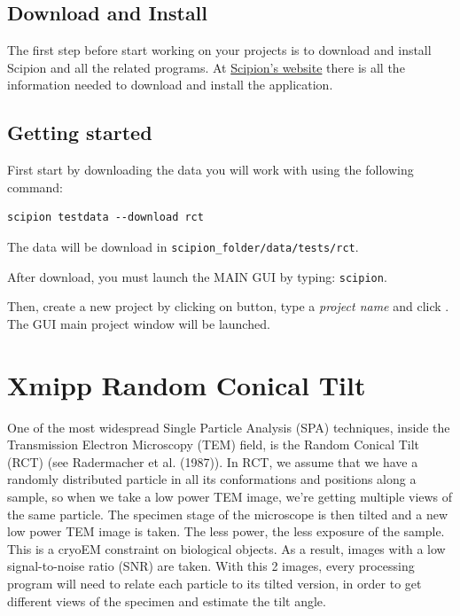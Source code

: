 \documentclass[12pt]{article} %
\begin{document}
\subsection{Download and Install}

The first step before start working on your projects is to download and
install Scipion and all the related programs. At \href{http://scipionwiki.cnb.csic.es}{Scipion's website} 
there is all the information needed to download and install the application.

\subsection{Getting started}

First start by downloading the data you will work with using the following command:

\begin{verbatim}
scipion testdata --download rct
\end{verbatim}

The data will be download in \verb+scipion_folder/data/tests/rct+.

After download, you must launch the MAIN GUI by typing: \verb+scipion+.

Then, create a new project by clicking on  button, type a 
\textit{project name} and click . The GUI main project window will be launched.

\section{Xmipp Random Conical Tilt}

One of the most widespread Single Particle Analysis (SPA) techniques, inside the Transmission
Electron Microscopy (TEM) field, is the Random Conical Tilt (RCT) (see Radermacher et al. (1987)). 
In RCT, we assume that we have a randomly distributed particle in all its conformations and positions 
along a sample, so when we take a low power TEM image, we’re getting multiple views of the same particle. 
The specimen stage of the microscope is then tilted and a new low power TEM image is taken. 
The less power, the less exposure of the sample. This is a cryoEM constraint on biological objects. 
As a result, images with a low signal-to-noise ratio (SNR) are taken. With this 2 images, 
every processing program will need to relate each particle to its tilted version, 
in order to get different views of the specimen and estimate the tilt angle.
\end{document}
